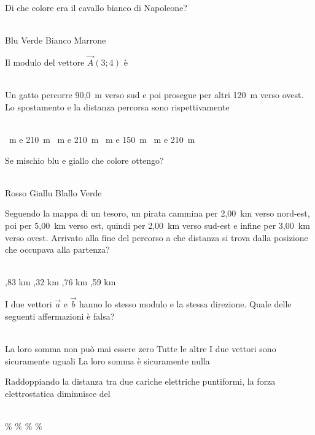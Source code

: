 \documentclass[a4paper,11pt]{exam}
\begin{document}
\begin{questions}
    
\question Di che colore era il cavallo bianco di Napoleone?\\\
\begin{oneparchoices}
  \choice Blu 
  \choice Verde
  \choice Bianco
  \choice Marrone
\end{oneparchoices}

    
\question Il modulo del vettore $\vec{A}(3;4)$ è\\\
\begin{oneparchoices}
  \choice 25
\end{oneparchoices}

    
\question Un gatto percorre 90,0~m verso sud e poi prosegue per altri 120~m verso ovest. Lo spostamento e la distanza percorsa sono rispettivamente\\\
\begin{oneparchoices}
  \choice 150~m e 210~m
  \choice 30~m e 210~m
  ~m e 150~m
  \choice 210~m e 210~m
\end{oneparchoices}

    
\question Se mischio blu e giallo che colore ottengo?\\\
\begin{oneparchoices}
  \choice Rosso
  \choice Giallu
  \choice Blallo
  \choice Verde
\end{oneparchoices}

    
\question Seguendo la mappa di un tesoro, un pirata cammina per 2,00~km verso nord-est, poi per 5,00~km verso est, quindi per 2,00~km verso sud-est e infine per 3,00~km verso ovest. Arrivato alla fine del percorso a che distanza si trova dalla posizione che occupava alla partenza?\\\
\begin{oneparchoices}
  \choice 4,83 km
  \choice 6,32 km
  \choice 4,76 km
  \choice 4,59 km
\end{oneparchoices}

    
\question I due vettori $\vec{a}$ e $\vec{b}$ hanno lo stesso modulo e la stessa direzione. Quale delle seguenti affermazioni è falsa?\\\
\begin{oneparchoices}
  \choice La loro somma non può mai essere zero
  \choice Tutte le altre
  \choice I due vettori sono sicuramente uguali
  \choice La loro somma è sicuramente nulla
\end{oneparchoices}

    
\question Raddoppiando la distanza tra due cariche elettriche puntiformi, la forza elettrostatica diminuisce del\\\
\begin{oneparchoices}
  \choice 75\%
  \choice 25\%
  \choice 50\%
  \%
\end{oneparchoices}

    
\end{questions}
\end{document}

